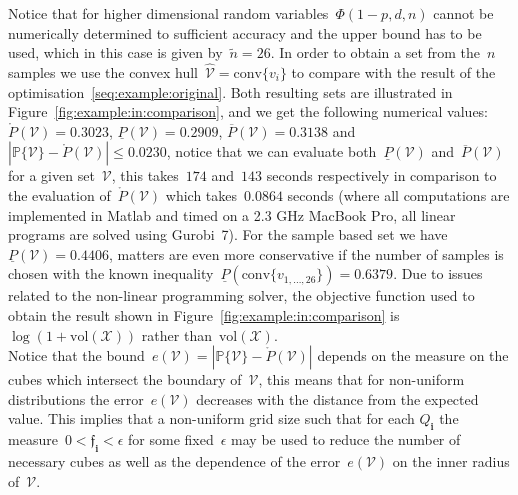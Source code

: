 \documentclass[letterpaper, 10pt, conference]{ieeeconf} %
\providecommand{\abs}[1]{\left\lvert#1\right\rvert}
\providecommand{\conv}{\text{conv}}
\providecommand{\bfa}[1]{\mathbf{#1}}
\begin{document}
%
Notice that for higher dimensional random variables~$\Phi(1-p,d,n)$ cannot be numerically determined to sufficient accuracy and the upper bound has to be used, which in this case is given by~$\tilde n=26$.
%
In order to obtain a set from the~$n$ samples we use the convex hull~$\hat{\mathcal V}=\conv\{v_i\}$ to compare with the result of the optimisation~\eqref{seq:example:original}.
%
Both resulting sets are illustrated in Figure~\ref{fig:example:in:comparison}, and we get the following numerical values: $\mathring{P}(\mathcal V) = 0.3023$, $\underline{P}(\mathcal V) = 0.2909$, $\overline{P}(\mathcal V)=0.3138$ and $\abs{\mathbb P\{\mathcal V\}-\mathring{P}(\mathcal V)}\leq 0.0230$, notice that we can evaluate both~$\underline{P}(\mathcal V)$ and~$\overline{P}(\mathcal V)$ for a given set~$\mathcal V$, this takes~$174$ and~$143$ seconds respectively in comparison to the evaluation of~$\mathring{P}(\mathcal V)$ which takes~$0.0864$ seconds (where all computations are implemented in Matlab and timed on a 2.3 GHz MacBook Pro, all linear programs are solved using Gurobi~7).
%
For the sample based set we have~$\underline{P}(\mathcal V)=0.4406$, matters are even more conservative if the number of samples is chosen with the known inequality~$\underline{P}(\conv\{v_{1,\dots,26}\})=0.6379$.
%
Due to issues related to the non-linear programming solver, the objective function used to obtain the result shown in Figure~\ref{fig:example:in:comparison} is~$\log(1+\text{vol}(\mathcal X))$ rather than~$\text{vol}(\mathcal X)$.
%
\\[1em]
%
Notice that the bound~$e(\mathcal V) = \abs{\mathbb P\{\mathcal V\}-\mathring{P}(\mathcal V)}$ depends on the measure on the cubes which intersect the boundary of~$\mathcal V$, this means that for non-uniform distributions the error~$e(\mathcal V)$ decreases with the distance from the expected value.
%
This implies that a non-uniform grid size such that for each $Q_\bfa{i}$ the measure~$0<\mathfrak{f}_\bfa{i}<\epsilon$ for some fixed~$\epsilon$ may be used to reduce the number of necessary cubes as well as the dependence of the error~$e(\mathcal V)$ on the inner radius of~$\mathcal V$.
\end{document}

